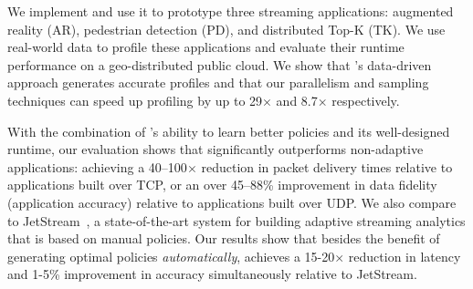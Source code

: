 \begin{enumerate}[leftmargin=*, topsep=5pt]
\end{enumerate}

We implement \awstream{} and use it to prototype three streaming applications:
augmented reality (AR), pedestrian detection (PD), and distributed Top-K
(TK). We use real-world data to profile these applications and evaluate their
runtime performance on a geo-distributed public cloud.  We show that
\awstream{}'s data-driven approach generates accurate profiles and that our
parallelism and sampling techniques can speed up profiling by up to 29$\times$
and 8.7$\times$ respectively.

With the combination of \awstream{}'s ability to learn better policies and its
well-designed runtime, our evaluation shows that \awstream{} significantly
outperforms non-adaptive applications: achieving a 40--100$\times$ reduction in
packet delivery times relative to applications built over TCP, or an over
45--88\% improvement in data fidelity (application accuracy) relative to
applications built over UDP. We also compare \awstream{} to
JetStream~\cite{rabkin2014aggregation}, a state-of-the-art system for building
adaptive streaming analytics that is based on manual policies. Our results show
that besides the benefit of generating optimal policies \textit{automatically},
\awstream{} achieves a 15-20$\times$ reduction in latency and 1-5\% improvement
in accuracy simultaneously relative to JetStream.


